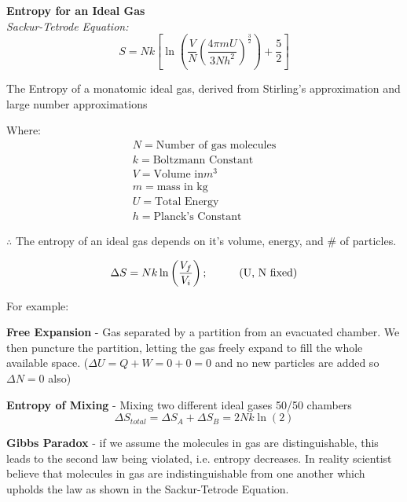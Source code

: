 \begin{shaded}
\textbf{Entropy for an Ideal Gas}\\
\textit{Sackur-Tetrode Equation:}
\begin{equation}
    S = Nk\left[\ln\left(\frac{V}{N} \left(\frac{4\pi m U}{3Nh^2}\right)^{\frac{3}{2}}\right)+\frac{5}{2} \right]
\end{equation}
\begin{note}
The Entropy of a monatomic ideal gas, derived from Stirling's approximation and large number approximations
\end{note}
Where:
\begin{equation*}
\begin{split}
N = \text{Number of gas molecules} \\
k = \text{Boltzmann Constant} \\
V = \text{Volume in}m^3 \\
m = \text{mass in kg} \\
U = \text{Total Energy} \\
h = \text{Planck's Constant}
\end{split}
\end{equation*}
\end{shaded}

$\therefore$ The entropy of an ideal gas depends on it's volume, energy, and # of particles. 

\begin{equation}
    \Delta S = Nk\ln\left(\frac{V_f}{V_i}\right)  ; \hspace{10mm} \text{(U, N fixed)}
\end{equation}

 \newpage
 For example:
 
 \textbf{Free Expansion} - Gas separated by a partition from an evacuated chamber. We then puncture the partition, letting the gas freely expand to fill the whole available space. ($\Delta U = Q+W = 0+0 = 0$ and no new particles are added so $\Delta N = 0$ also)


\textbf{Entropy of Mixing}
- Mixing two different ideal gases 50/50 chambers
\begin{equation}
    \Delta S_{total} = \Delta S_A + \Delta S_B = 2Nk\ln(2)
\end{equation}

\textbf{Gibbs Paradox} - if we assume the molecules in gas are distinguishable, this leads to the second law being violated, i.e. entropy decreases. In reality scientist believe that molecules in gas are indistinguishable from one another which upholds the law as shown in the Sackur-Tetrode Equation.


